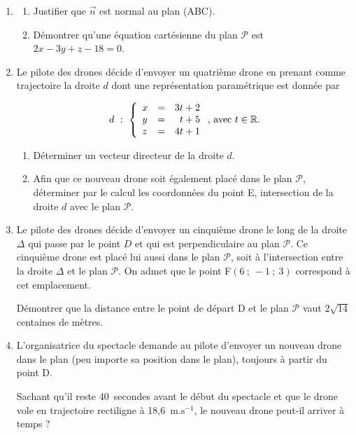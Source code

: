 \documentclass[10pt]{article}
\providecommand{\R}{\mathbb{R}}
\providecommand{\vect}[1]{\overrightarrow{#1}}
\begin{document}
\begin{enumerate}[resume]
	\item 
	\begin{enumerate}
		\item Justifier que $\vect{n}$ est normal au plan (ABC).
		\item Démontrer qu'une équation cartésienne du plan $\mathcal{P}$ est $2x - 3y + z - 18 = 0$.
	\end{enumerate}
	\item Le pilote des drones décide d'envoyer un quatrième drone en prenant comme trajectoire la droite $d$ dont une représentation paramétrique est donnée par 

\[ d~:~\left\{\begin{array}{l c l}
x&=&3t+2\\y&=&\phantom{3}t+5\\z&=&4t+1\end{array}\right.\text{, avec } t \in \R. \]
	\begin{enumerate}
		\item Déterminer un vecteur directeur de la droite $d$.
		\item Afin que ce nouveau drone soit également placé dans le plan $\mathcal{P}$, déterminer par le calcul les coordonnées du point E, intersection de la droite $d$ avec le plan $\mathcal{P}$.
	\end{enumerate}
	\item Le pilote des drones décide d'envoyer un cinquième drone le long de la droite $\Delta$ qui passe par le point $D$ et qui est perpendiculaire au plan $\mathcal{P}$. Ce cinquième drone est placé lui aussi dans le plan $\mathcal{P}$, soit à l'intersection entre la droite $\Delta$ et le plan $\mathcal{P}$. On admet que le point F$(6~;~-1~;~3)$ correspond à cet emplacement.
	
Démontrer que la distance entre le point de départ D et le plan $\mathcal{P}$ vaut $2\sqrt{14}$ centaines de mètres.
	\item L'organisatrice du spectacle demande au pilote d'envoyer un nouveau drone dans le plan (peu importe sa position dans le plan), toujours à partir du point D.
	
Sachant qu'il reste $40$~secondes avant le début du spectacle et que le drone vole en trajectoire rectiligne à 18,6~$\text{m.s}^{-1}$, le nouveau drone peut-il arriver à temps ?
\end{enumerate}
\end{document}
